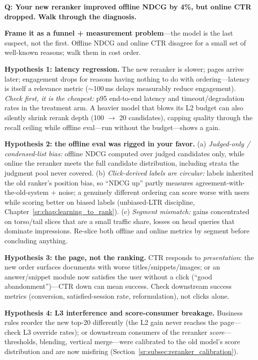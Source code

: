\begin{interviewq}
\textbf{Q: Your new reranker improved offline NDCG by 4\%, but online CTR dropped. Walk through the diagnosis.}

 \quad {} \quad \badgefreq{\freqhigh}

\stronganswer

\textbf{Frame it as a funnel + measurement problem}---the model is the last suspect, not the first. Offline NDCG and online CTR disagree for a small set of well-known reasons; walk them in cost order.

\textbf{Hypothesis 1: latency regression.} The new reranker is slower; pages arrive later; engagement drops for reasons having nothing to do with ordering---latency is itself a relevance metric ($\sim$100\,ms delays measurably reduce engagement). \textit{Check first, it is the cheapest:} p95 end-to-end latency and timeout/degradation rates in the treatment arm. A heavier model that blows its L2 budget can also silently shrink rerank depth (100 $\to$ 20 candidates), capping quality through the recall ceiling while offline eval---run without the budget---shows a gain.

\textbf{Hypothesis 2: the offline eval was rigged in your favor.} (a) \textit{Judged-only / condensed-list bias:} offline NDCG computed over judged candidates only, while online the reranker meets the full candidate distribution, including strata the judgment pool never covered. (b) \textit{Click-derived labels are circular:} labels inherited the old ranker's position bias, so ``NDCG up'' partly measures agreement-with-the-old-system + noise; a genuinely different ordering can score worse with users while scoring better on biased labels (unbiased-LTR discipline, Chapter~\ref{sr:chap:learning_to_rank}). (c) \textit{Segment mismatch:} gains concentrated on torso/tail slices that are a small traffic share, losses on head queries that dominate impressions. Re-slice both offline and online metrics by segment before concluding anything.

\textbf{Hypothesis 3: the page, not the ranking.} CTR responds to \textit{presentation}: the new order surfaces documents with worse titles/snippets/images; or an answer/snippet module now satisfies the user without a click (``good abandonment'')---CTR down can mean success. Check downstream success metrics (conversion, satisfied-session rate, reformulation), not clicks alone.

\textbf{Hypothesis 4: L3 interference and score-consumer breakage.} Business rules reorder the new top-20 differently (the L2 gain never reaches the page---check L3 override rates); or downstream consumers of the reranker \textit{score}---thresholds, blending, vertical merge---were calibrated to the old model's score distribution and are now misfiring (Section~\ref{sr:subsec:reranker_calibration}).


\end{interviewq}
